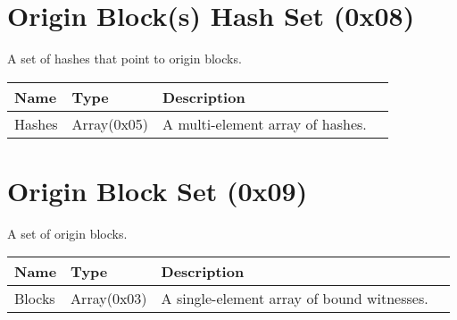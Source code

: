 \documentclass[11pt]{article}
\begin{document}
\section{Origin Block(s) Hash Set (0x08)}
A set of hashes that point to origin blocks.
\begin{center}
\begin{tabular}{ |l|l|l|l| } 
\hline
\textbf{Name} & \textbf{Type} & \textbf{Description}\\
\hline
Hashes & Array(0x05) & A multi-element array of hashes.\\  
 
\hline
\end{tabular}
\end{center}

\section{Origin Block Set (0x09)}
A set of origin blocks.
\begin{center}
\begin{tabular}{ |l|l|l|l| } 
\hline
\textbf{Name} & \textbf{Type} & \textbf{Description}\\
\hline
Blocks & Array(0x03) & A single-element array of bound witnesses.\\  
 
\hline
\end{tabular}
\end{center}
\end{document}
